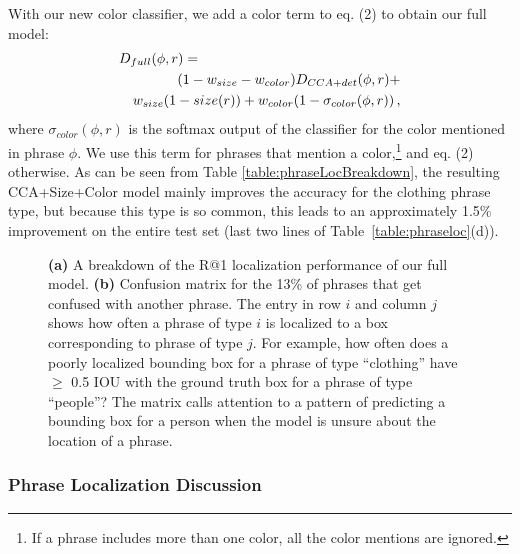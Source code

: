 \documentclass[twocolumn]{svjour3}
\begin{document}
With our new color classifier, we add a color term to eq. (2) to obtain our full model:
\begin{eqnarray} 
\lefteqn{D_{full}(\phi,r) = } \\ \label{eq:full} \nonumber 
& & (1-w_{size}-w_{color})D_{CCA+det}(\phi,r) + \\ \nonumber & & w_{size}(1-size(r)) + w_{color}(1-\sigma_{color}(\phi,r))\,, \nonumber
\end{eqnarray}
where $\sigma_{color}(\phi,r)$ is the softmax output of the classifier for the color mentioned in phrase $\phi$. We use this term for phrases that mention a color,\footnote{If a phrase includes more than one color, all the color mentions are ignored.} and eq. (2) otherwise. As can be seen from Table \ref{table:phraseLocBreakdown}, the resulting CCA+Size+Color model mainly improves the accuracy for the clothing phrase type, but because this type is so common, this leads to an approximately 1.5\% improvement on the entire test set (last two lines of Table~\ref{table:phraseloc}(d)).  


\begin{figure*}[h]
\centering
{}
\hspace{2cm}
\caption{{\bf (a)} A breakdown of the R@1 localization performance of our full model.  {\bf (b)} Confusion matrix for the 13\% of phrases that get confused with another phrase. The entry in row $i$ and column $j$ shows how often a phrase of type $i$ is localized to a box corresponding to phrase of type $j$. For example, how often does a poorly localized bounding box for a phrase of type ``clothing'' have $\geq$ 0.5 IOU with the ground truth box for a phrase of type ``people''? The matrix calls attention to a pattern of predicting a bounding box for a person when the model is unsure about the location of a phrase.}
\label{fig:phraseLocBreakdown}
\end{figure*}

\subsubsection{Phrase Localization Discussion}
\label{sec:localdicussion}
\end{document}
